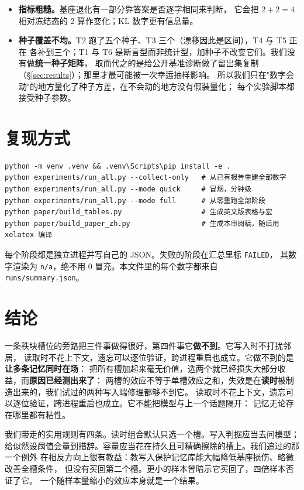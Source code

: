 \documentclass[11pt]{ctexart}
\begin{document}
\begin{itemize}
\textbf{但真正的瓶颈本地模型定位不了，我们把它测清楚了}：把该题抽出的\textbf{全部事实}放进提示词，
0.6B 答对 0.000、1.7B 答对 0.033 ——
两侧失败的原因都在机制的\textbf{上游}，所以两个尺度都无法定位瓶颈；
我们如实报告这一点，而不去比较两个都接近零的数。
能定位它的是\textbf{会做这些算术的读者}，而且只改变交给它的事实集：
指令与读者固定不变，给全部事实时它答对 0.679（在评到的 28 道上），
只给路由最好的一条时 0.033，给最好的两条时 0.033。
其中 18 道题\textbf{给全对、给一条错} —— 这是隔离最锋利的形式：
\textbf{理解能力显然够用，是交付的事实集不够}。多开一个槽买不到任何可测的收益，
这正是 §\ref{sec:results} 的两槽崩塌在\textbf{真实基准问题}上的复现。
这个对照用的是托管读者，而检索臂也还要付 0.433 那笔路由错误，
所以它测的是\textbf{读路径交付了什么}，而非机制额外贡献了什么。
\item \textbf{指标粗糙。}基座退化有一部分靠答案是否逐字相同来判断，
它会把 $2+2=4$ 相对冻结态的 2 算作变化；KL 数字更有信息量。
\item \textbf{种子覆盖不均。}T2 跑了五个种子、T3 三个（漂移因此是区间），T4 与 T5 正在
各补到三个；T1 与 T6 是断言型而非统计型，加种子不改变它们。我们没有做\textbf{统一种子矩阵}，
取而代之的是给公开基准诊断做了留出集复制（§\ref{sec:results}）；那里才最可能被一次幸运抽样影响。
所以我们只在"数字会动"的地方量化了种子方差，在不会动的地方没有假装量化；
每个实验脚本都接受种子参数。
\end{itemize}

\section{复现方式}
\begin{verbatim}
python -m venv .venv && .venv\Scripts\pip install -e .
python experiments/run_all.py --collect-only   # 从已有报告重建全部数字
python experiments/run_all.py --mode quick     # 冒烟，分钟级
python experiments/run_all.py --mode full      # 从零重跑全部阶段
python paper/build_tables.py                   # 生成英文版表格与宏
python paper/build_paper_zh.py                 # 生成本审阅稿，随后用 xelatex 编译
\end{verbatim}
每个阶段都是独立进程并写自己的 JSON。失败的阶段在汇总里标 \texttt{FAILED}，
其数字渲染为 \texttt{n/a}，绝不用 0 冒充。本文件里的每个数字都来自
\texttt{runs/summary.json}。

\section{结论}
一条秩块槽位的旁路把三件事做得很好，第四件事它\textbf{做不到}。它写入时不打扰邻居，
读取时不花上下文，遗忘可以逐位验证，跨进程重启也成立。它做不到的是\textbf{让多条记忆同时在场}：
把所有槽加起来毫无价值，选两个就已经损失大部分收益，而\textbf{原因已经测出来了}：
两槽的效应不等于单槽效应之和，失效是在\textbf{读时}被制造出来的，我们试过的两种写入端修理都够不到它。
读取时不花上下文，遗忘可以逐位验证，跨进程重启也成立。它不能把模型与上一个话题隔开：
记忆无论存在哪里都有粘性。

我们带走的实用规则有四条。读时组合默认只选一个槽。写入判据应当去问模型；
给似然设阈值会量到措辞。容量应当花在持久且可精确擦除的槽上。我们追过的那一个例外
在相反方向上很有教益：教写入保护记忆库能大幅降低基座损伤、略微改善全槽条件，
但没有买回第二个槽。更小的样本曾暗示它买回了，四倍样本否证了它。
一个随样本量缩小的效应本身就是一个结果。
\end{document}
